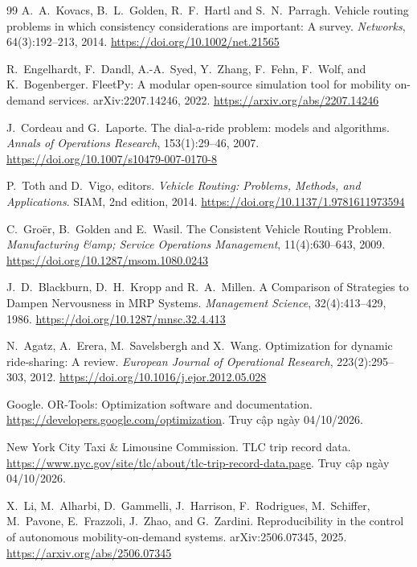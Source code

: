 \begin{thebibliography}{99}
A.~A.~Kovacs, B.~L.~Golden, R.~F.~Hartl and S.~N.~Parragh.
\newblock Vehicle routing problems in which consistency considerations are important: A survey.
\newblock \emph{Networks}, 64(3):192--213, 2014.
\newblock \url{https://doi.org/10.1002/net.21565}

R.~Engelhardt, F.~Dandl, A.-A.~Syed, Y.~Zhang, F.~Fehn, F.~Wolf, and K.~Bogenberger.
\newblock FleetPy: A modular open-source simulation tool for mobility on-demand services.
\newblock arXiv:2207.14246, 2022.
\newblock \url{https://arxiv.org/abs/2207.14246}

J.~Cordeau and G.~Laporte.
\newblock The dial-a-ride problem: models and algorithms.
\newblock \emph{Annals of Operations Research}, 153(1):29--46, 2007.
\newblock \url{https://doi.org/10.1007/s10479-007-0170-8}

P.~Toth and D.~Vigo, editors.
\newblock \emph{Vehicle Routing: Problems, Methods, and Applications}.
\newblock SIAM, 2nd edition, 2014.
\newblock \url{https://doi.org/10.1137/1.9781611973594}

C.~Groër, B.~Golden and E.~Wasil.
\newblock The Consistent Vehicle Routing Problem.
\newblock \emph{Manufacturing \&amp; Service Operations Management}, 11(4):630--643, 2009.
\newblock \url{https://doi.org/10.1287/msom.1080.0243}

J.~D.~Blackburn, D.~H.~Kropp and R.~A.~Millen.
\newblock A Comparison of Strategies to Dampen Nervousness in MRP Systems.
\newblock \emph{Management Science}, 32(4):413--429, 1986.
\newblock \url{https://doi.org/10.1287/mnsc.32.4.413}

N.~Agatz, A.~Erera, M.~Savelsbergh and X.~Wang.
\newblock Optimization for dynamic ride-sharing: A review.
\newblock \emph{European Journal of Operational Research}, 223(2):295--303, 2012.
\newblock \url{https://doi.org/10.1016/j.ejor.2012.05.028}

Google.
\newblock OR-Tools: Optimization software and documentation.
\newblock \url{https://developers.google.com/optimization}. Truy cập ngày 04/10/2026.

New York City Taxi \& Limousine Commission.
\newblock TLC trip record data.
\newblock \url{https://www.nyc.gov/site/tlc/about/tlc-trip-record-data.page}. Truy cập ngày 04/10/2026.

X.~Li, M.~Alharbi, D.~Gammelli, J.~Harrison, F.~Rodrigues, M.~Schiffer, M.~Pavone, E.~Frazzoli, J.~Zhao, and G.~Zardini.
\newblock Reproducibility in the control of autonomous mobility-on-demand systems.
\newblock arXiv:2506.07345, 2025.
\newblock \url{https://arxiv.org/abs/2506.07345}


\end{thebibliography}
